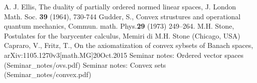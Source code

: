 \documentclass[12pt,letterpaper]{article}
\newcommand{\<}{\langle}
\begin{document}
\begin{thebibliography}{WWW}
 A. J. Ellis, The duality of partially ordered normed linear spaces, J. London Math. Soc. \textbf{39} (1964), 730-744
 Gudder, S., Convex strustures and operational quantum mechanics, Commun. math. Phys.{\bf 29} (1973) 249--264.
 M.H. Stone, Postulates for the barycenter calculus, Memiri di M.H. Stone (Chicago, USA)
 Capraro, V., Fritz, T., On the axiomatization of convex sybsets of Banach spaces, arXiv:1105.1270v3[math.MG]20Oct.2015
 Seminar notes: Ordered vector spaces (Seminar\_notes/ovs.pdf)
 Seminar notes: Convex sets (Seminar\_notes/convex.pdf)

\end{thebibliography}
\end{document}
